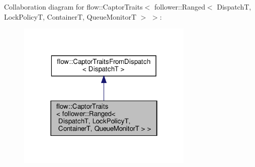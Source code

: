 Collaboration diagram for flow\+:\+:Captor\+Traits$<$ follower\+:\+:Ranged$<$ DispatchT, Lock\+PolicyT, ContainerT, Queue\+MonitorT $>$ $>$\+:
\nopagebreak
\begin{figure}[H]
\begin{center}
\leavevmode
\includegraphics[width=238pt]{structflow_1_1_captor_traits_3_01follower_1_1_ranged_3_01_dispatch_t_00_01_lock_policy_t_00_01_cf2b572e9b9859067697e559bdb6043f1}
\end{center}
\end{figure}
